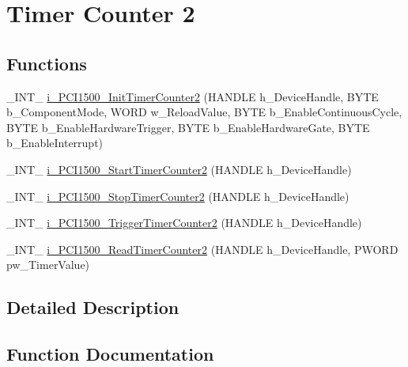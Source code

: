 \hypertarget{group___timer2}{}\section{Timer Counter 2}
\label{group___timer2}
\subsection*{Functions}
\begin{DoxyCompactItemize}
\item 
\+\_\+\+I\+N\+T\+\_\+ \mbox{\hyperlink{group___timer2_ga4c89517b65ab584d8616c8d7e3605f37}{i\+\_\+\+P\+C\+I1500\+\_\+\+Init\+Timer\+Counter2}} (H\+A\+N\+D\+LE h\+\_\+\+Device\+Handle, B\+Y\+TE b\+\_\+\+Component\+Mode, W\+O\+RD w\+\_\+\+Reload\+Value, B\+Y\+TE b\+\_\+\+Enable\+Continuous\+Cycle, B\+Y\+TE b\+\_\+\+Enable\+Hardware\+Trigger, B\+Y\+TE b\+\_\+\+Enable\+Hardware\+Gate, B\+Y\+TE b\+\_\+\+Enable\+Interrupt)
\item 
\+\_\+\+I\+N\+T\+\_\+ \mbox{\hyperlink{group___timer2_ga4520405a4872e8bb622f4da64a7665e1}{i\+\_\+\+P\+C\+I1500\+\_\+\+Start\+Timer\+Counter2}} (H\+A\+N\+D\+LE h\+\_\+\+Device\+Handle)
\item 
\+\_\+\+I\+N\+T\+\_\+ \mbox{\hyperlink{group___timer2_ga3de61f65cc00dc5a002bec74add4f647}{i\+\_\+\+P\+C\+I1500\+\_\+\+Stop\+Timer\+Counter2}} (H\+A\+N\+D\+LE h\+\_\+\+Device\+Handle)
\item 
\+\_\+\+I\+N\+T\+\_\+ \mbox{\hyperlink{group___timer2_ga4a27cc728f1fc728bda7fcad39d458b8}{i\+\_\+\+P\+C\+I1500\+\_\+\+Trigger\+Timer\+Counter2}} (H\+A\+N\+D\+LE h\+\_\+\+Device\+Handle)
\item 
\+\_\+\+I\+N\+T\+\_\+ \mbox{\hyperlink{group___timer2_ga3e06d8298ba00f3652eb97082c7a5ea7}{i\+\_\+\+P\+C\+I1500\+\_\+\+Read\+Timer\+Counter2}} (H\+A\+N\+D\+LE h\+\_\+\+Device\+Handle, P\+W\+O\+RD pw\+\_\+\+Timer\+Value)
\end{DoxyCompactItemize}


\subsection{Detailed Description}


\subsection{Function Documentation}
\mbox{\label{group___timer2_ga4c89517b65ab584d8616c8d7e3605f37}} 
